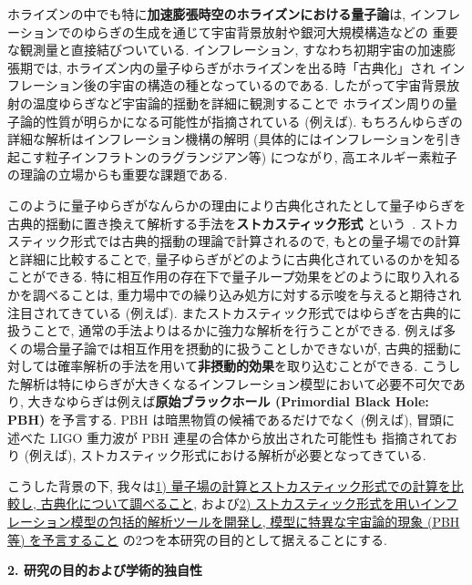 \documentclass[11pt,a4j,dvipdfmx]{jarticle} 					%
\newcommand{\研究課題名}{\mgfamily\sffamily ストカスティック形式で迫る重力と量子論}
\newcommand{\研究機関名}{\mgfamily\sffamily 名古屋大学}
\newcommand{\研究代表者氏名}{\mgfamily\sffamily 多田祐一郎}
\newcommand{\研究期間の最終元号年度}{34}  %
\renewcommand{\emph}[1]{{\sffamily\gtfamily\bfseries #1}}
\begin{document}
ホライズンの中でも特に\emph{加速膨張時空のホライズンにおける量子論}は, インフレーションでのゆらぎの生成を通じて宇宙背景放射や銀河大規模構造などの
重要な観測量と直接結びついている. インフレーション, すなわち初期宇宙の加速膨張期では, ホライズン内の量子ゆらぎがホライズンを出る時「古典化」され
インフレーション後の宇宙の構造の種となっているのである. したがって宇宙背景放射の温度ゆらぎなど宇宙論的揺動を詳細に観測することで
ホライズン周りの量子論的性質が明らかになる可能性が指摘されている (例えば\cite{Maldacena:2015bha}).
もちろんゆらぎの詳細な解析はインフレーション機構の解明 (具体的にはインフレーションを引き起こす粒子インフラトンのラグランジアン等) につながり,
高エネルギー素粒子の理論の立場からも重要な課題である.

このように量子ゆらぎがなんらかの理由により古典化されたとして量子ゆらぎを古典的揺動に置き換えて解析する手法を\emph{ストカスティック形式}
という~\cite{Starobinsky:1986fx}. ストカスティック形式では古典的揺動の理論で計算されるので, もとの量子場での計算と詳細に比較することで,
量子ゆらぎがどのように古典化されているのかを知ることができる. 特に相互作用の存在下で量子ループ効果をどのように取り入れるかを調べることは,
重力場中での繰り込み処方に対する示唆を与えると期待され注目されてきている (例えば\cite{Tokuda:2017fdh}).
またストカスティック形式ではゆらぎを古典的に扱うことで, 通常の手法よりはるかに強力な解析を行うことができる.
例えば多くの場合量子論では相互作用を摂動的に扱うことしかできないが, 古典的揺動に対しては確率解析の手法を用いて\emph{非摂動的効果}を取り込むことができる.
こうした解析は特にゆらぎが大きくなるインフレーション模型において必要不可欠であり, 大きなゆらぎは例えば\emph{原始ブラックホール (Primordial Black Hole: PBH)}
を予言する. PBH は暗黒物質の候補であるだけでなく (例えば\cite{Carr:2016drx}), 冒頭に述べた LIGO 重力波が PBH 連星の合体から放出された可能性も
指摘されており (例えば\cite{Sasaki:2016jop}), ストカスティック形式における解析が必要となってきている.

こうした背景の下, 我々は\ul{1) 量子場の計算とストカスティック形式での計算を比較し,
古典化について調べること}, および\ul{2) ストカスティック形式を用いインフレーション模型の包括的解析ツールを開発し, 模型に特異な宇宙論的現象 (PBH等) 
を予言すること} の2つを本研究の目的として据えることにする.



\begin{mdframed}[roundcorner=0.5zw,
	innertopmargin=0.8zw,innerbottommargin=0.8zw,
	linecolor=black!50,linewidth=0.2zw,
	backgroundcolor=black!10]
	{\bfseries\gtfamily\sffamily\large 2. 研究の目的および学術的独自性}
\end{mdframed}
\end{document}
